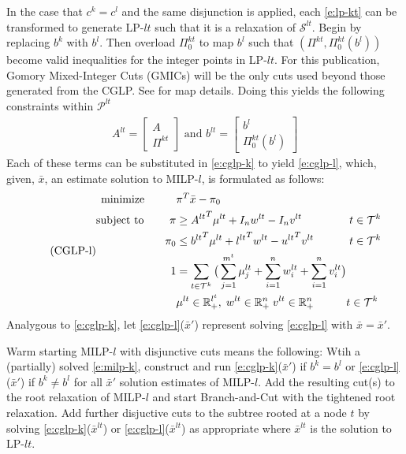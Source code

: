 \documentclass[10pt]{article}
\begin{document}
	In the case that $ c^k = c^l $ and the same disjunction is applied, each \ref{e:lp-kt} can be transformed to generate LP-$ lt $ such that it is a relaxation of $ \mathcal{S}^{lt} $. Begin by replacing $ b^k $ with $ b^l  $. Then overload $ \Pi_0^{kt} $ to map $ b^l $ such that $ (\Pi^{kt}, \Pi_0^{kt}(b^l)) $ become valid inequalities for the integer points in LP-$ lt $. For this publication, Gomory Mixed-Integer Cuts (GMICs) will be the only cuts used beyond those generated from the CGLP. See \cite{guz} for map details. Doing this yields the following constraints within $ \mathcal{P}^{lt} $
	\begin{align*}
		A^{lt} = \begin{bmatrix} A \\ \Pi^{kt} \end{bmatrix} \text{ and } b^{lt} = \begin{bmatrix} b^l \\ \Pi_0^{kt}(b^l) \end{bmatrix}
	\end{align*}
	Each of these terms can be substituted in \ref{e:cglp-k} to yield \ref{e:cglp-l}, which, given, $ \bar{x} $, an estimate solution to MILP-$ l $, is formulated as follows:
	\begin{equation} \tag{CGLP-l}
		\begin{alignedat}{2} \label{e:cglp-l} 
			\text{minimize } \; \; \qquad & \pi^T \bar{x} - \pi_0 && \\
			\text{subject to } \qquad \pi & \geq {A^{lt}}^T \mu^{lt} + I_n w^{lt} - I_n v^{lt} && \;  t \in \mathcal{T}^k \\
			\pi_0 & \leq {b^{lt}}^T \mu^{lt} + {l^{lt}}^T w^{lt} - {u^{lt}}^T v^{lt} && \; t \in \mathcal{T}^k \\
			1 & = \sum_{t \in \mathcal{T}^k} \big( \sum_{j=1}^{m^t} \mu_j^{lt} + \sum_{i=1}^{n} w_i^{lt} + \sum_{i=1}^{n} v_i^{lt} \big) && \\
			& \mu^{lt} \in \mathbb{R}_+^{l^t}, \; w^{lt} \in \mathbb{R}_+^n \; v^{lt} \in \mathbb{R}_+^n && t \in \mathcal{T}^k
		\end{alignedat}
	\end{equation}
	Analygous to \ref{e:cglp-k}, let \ref{e:cglp-l}($ \bar{x}' $) represent solving \ref{e:cglp-l} with $ \bar{x} = \bar{x}' $.

	Warm starting MILP-$ l $ with disjunctive cuts means the following: Wtih a (partially) solved \ref{e:milp-k}, construct and run \ref{e:cglp-k}($\bar{x}'$) if $ b^k = b^l $ or \ref{e:cglp-l}($\bar{x}'$) if $ b^k \neq b^l $ for all $\bar{x}'$ solution estimates of MILP-$ l $. Add the resulting cut(s) to the root relaxation of MILP-$ l $ and start Branch-and-Cut with the tightened root relaxation. Add further disjuctive cuts to the subtree rooted at a node $ t $ by solving \ref{e:cglp-k}($ \bar{x}^{lt} $) or \ref{e:cglp-l}($ \bar{x}^{lt} $) as appropriate where $ \bar{x}^{lt} $ is the solution to LP-$ lt $.
	
\end{document}
